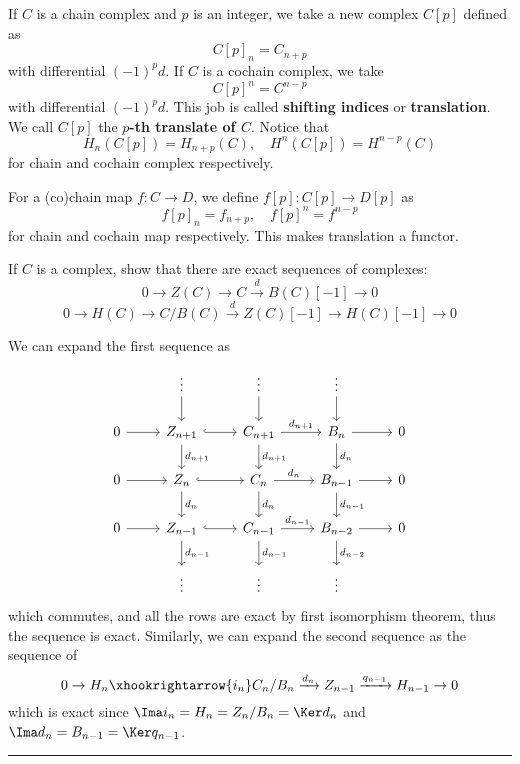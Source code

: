 \begin{defn} If $C$ is a chain complex and $p$ is an integer, we take a new complex $C[p]$ defined as
\begin{equation}
C[p]_n=C_{n+p}
\end{equation}
with differential $(-1)^p d$. If $C$ is a cochain complex, we take
\begin{equation}
C[p]^n=C^{n-p}
\end{equation}
with differential $(-1)^p d$. This job is called \textbf{shifting indices} or \textbf{translation}. We call $C[p]$ the \textbf{$p$-th translate of $C$}. Notice that
\begin{equation}
H_n(C[p])=H_{n+p}(C),\quad H^n(C[p])=H^{n-p}(C)
\end{equation}
for chain and cochain complex respectively.

For a (co)chain map $f:C\rightarrow D$, we define $f[p]:C[p]\rightarrow D[p]$ as
\begin{equation}
f[p]_n=f_{n+p}, \quad f[p]^n=f^{n-p}
\end{equation}
for chain and cochain map respectively. This makes translation a functor.
\end{defn}

\begin{exer} If $C$ is a complex, show that there are exact sequences of complexes:
\begin{equation}
0\rightarrow Z(C)\rightarrow C\xrightarrow{d} B(C)[-1]\rightarrow 0
\end{equation}
\begin{equation}
0\rightarrow H(C)\rightarrow C/B(C)\xrightarrow{d} Z(C)[-1]\rightarrow H(C)[-1]\rightarrow 0
\end{equation}
\end{exer}
\begin{solution}
We can expand the first sequence as
\begin{equation}
\begin{tikzcd}
&\vdots\arrow{d}&\vdots\arrow{d}&\vdots\arrow{d}&\\
0\arrow{r}&Z_{n+1}\arrow[r,hook] \arrow{d}{d_{n+1}}&C_{n+1}\arrow{r}{d_{n+1}}\arrow{d}{d_{n+1}}&B_{n}\arrow{d}{d_{n}}\arrow{r}&0\\
0\arrow{r}&Z_{n}\arrow[r,hook] \arrow{d}{d_{n}}&C_{n}\arrow{r}{d_{n}}\arrow{d}{d_{n}}&B_{n-1}\arrow{d}{d_{n-1}}\arrow{r}&0\\
0\arrow{r}&Z_{n-1}\arrow[r,hook] \arrow{d}{d_{n-1}}&C_{n-1}\arrow{r}{d_{n-1}}\arrow{d}{d_{n-1}}&B_{n-2}\arrow{d}{d_{n-2}}\arrow{r}&0\\
&\vdots&\vdots&\vdots&
\end{tikzcd}
\end{equation}
which commutes, and all the rows are exact by first isomorphism theorem, thus the sequence is exact. Similarly, we can expand the second sequence as the sequence of
\begin{equation}
0\rightarrow H_n\xhookrightarrow{i_n} C_n/B_n\xrightarrow{d_n} Z_{n-1}\xrightarrow{q_{n-1}} H_{n-1}\rightarrow 0
\end{equation}
which is exact since $\Ima i_n=H_n=Z_n/B_n=\Ker d_n$ and $\Ima d_n=B_{n-1}=\Ker q_{n-1}$.
\end{solution}

\noindent\rule{\textwidth}{1pt}
\newline